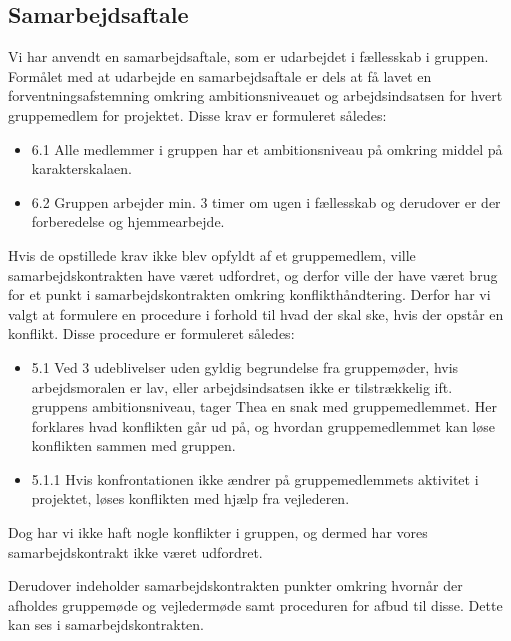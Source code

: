 \subsection{Samarbejdsaftale}
Vi har anvendt en samarbejdsaftale, som er udarbejdet i fællesskab i gruppen. Formålet med at udarbejde en samarbejdsaftale er dels at få lavet en forventningsafstemning omkring ambitionsniveauet og arbejdsindsatsen for hvert gruppemedlem for projektet. Disse krav er formuleret således:
\begin{itemize}
	\item 6.1 Alle medlemmer i gruppen har et ambitionsniveau på omkring middel på karakterskalaen. 
	\item 6.2 Gruppen arbejder min. 3 timer om ugen i fællesskab og derudover er der forberedelse og hjemmearbejde. 
\end{itemize}

 Hvis de opstillede krav ikke blev opfyldt af et gruppemedlem, ville samarbejdskontrakten have været udfordret, og derfor ville der have været brug for et punkt i samarbejdskontrakten omkring konflikthåndtering. Derfor har vi valgt at formulere en procedure i forhold til hvad der skal ske, hvis der opstår en konflikt. Disse procedure er formuleret således: 
 \begin{itemize}
 	\item 5.1 Ved 3 udeblivelser uden gyldig begrundelse fra gruppemøder, hvis arbejdsmoralen er lav, eller arbejdsindsatsen ikke er tilstrækkelig ift. gruppens ambitionsniveau, tager Thea en snak med gruppemedlemmet. Her forklares hvad konflikten går ud på, og hvordan gruppemedlemmet kan løse konflikten sammen med gruppen.
 		\item  5.1.1 Hvis konfrontationen ikke ændrer på gruppemedlemmets aktivitet i projektet, løses konflikten med hjælp fra vejlederen. 
\end{itemize}
 
  Dog har vi ikke haft nogle konflikter i gruppen, og dermed har vores samarbejdskontrakt ikke været udfordret. 

Derudover indeholder samarbejdskontrakten punkter omkring hvornår der afholdes gruppemøde og vejledermøde samt proceduren for afbud til disse. Dette kan ses i samarbejdskontrakten. 


